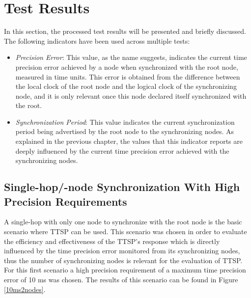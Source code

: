 \section{Test Results}
In this section, the processed test results will be presented and briefly discussed. The following indicators have been used across multiple tests:
\begin{itemize}
\item \textit{Precision Error}:  This value, as the name suggests, indicates the current time precision error achieved by a node when synchronized with the root node, measured in time units. This error is obtained from the difference between the local clock of the root node and the logical clock of the synchronizing node, and it is only relevant once this node declared itself synchronized with the root.
\item \textit{Synchronization Period}: This value indicates the current synchronization period being advertised by the root node to the synchronizing nodes. As explained in the previous chapter, the values that this indicator reports are deeply influenced by the current time precision error achieved with the synchronizing nodes.
\end{itemize}

\clearpage

\subsection{Single-hop/-node Synchronization With High Precision Requirements}
A single-hop with only one node to synchronize with the root node is the basic scenario where TTSP can be used. This scenario was chosen in order to evaluate the efficiency and effectiveness of the TTSP's response which is directly influenced by the time precision error monitored from its synchronizing nodes, thus the number of synchronizing nodes is relevant for the evaluation of TTSP. For this first scenario a high precision requirement of a maximum time precision error of 10 ms was chosen. The results of this scenario can be found in Figure \ref{10ms2nodes}.

